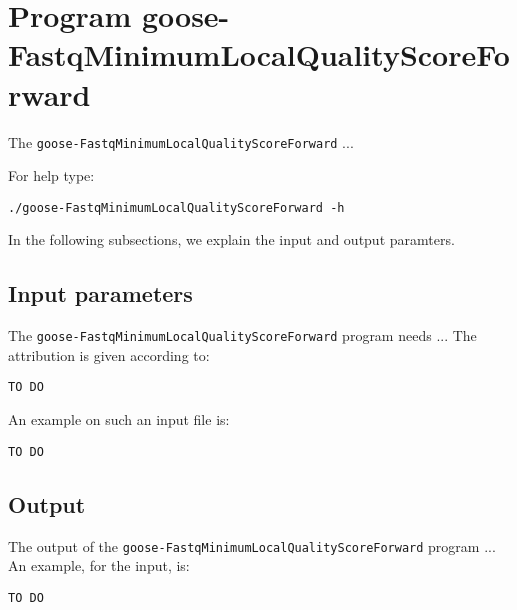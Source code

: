 \section{Program goose-FastqMinimumLocalQualityScoreForward}
The \texttt{goose-FastqMinimumLocalQualityScoreForward} ...

For help type:
\begin{lstlisting}
./goose-FastqMinimumLocalQualityScoreForward -h
\end{lstlisting}
In the following subsections, we explain the input and output paramters.

\subsection{Input parameters}

The \texttt{goose-FastqMinimumLocalQualityScoreForward} program needs ...
The attribution is given according to:
\begin{lstlisting}
TO DO
\end{lstlisting}

An example on such an input file is:
\begin{lstlisting}
TO DO
\end{lstlisting}

\subsection{Output}
The output of the \texttt{goose-FastqMinimumLocalQualityScoreForward} program ...
An example, for the input, is:
\begin{lstlisting}
TO DO
\end{lstlisting}
